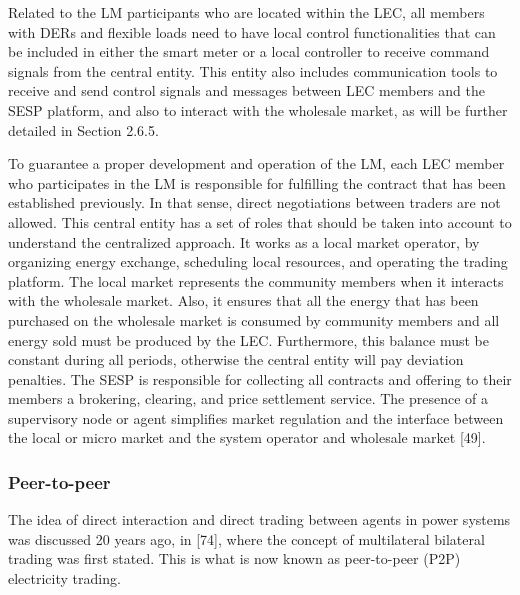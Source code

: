 Related to the LM participants who are located within the LEC, all members with DERs and flexible loads need to have local control functionalities that can be included in either the smart meter or a local controller to receive command signals from the central entity. This entity also includes communication tools to receive and send control signals and messages between LEC members and the SESP platform, and also to interact with the wholesale market, as will be further detailed in Section 2.6.5.

To guarantee a proper development and operation of the LM, each LEC member who participates in the LM is responsible for fulfilling the contract that has been established previously. In that sense, direct negotiations between traders are not allowed. This central entity has a set of roles that should be taken into account to understand the centralized approach. It works as a local market operator, by organizing energy exchange, scheduling local resources, and operating the trading platform. The local market represents the community members when it interacts with the wholesale market. Also, it ensures that all the energy that has been purchased on the wholesale market is consumed by community members and all energy sold must be produced by the LEC. Furthermore, this balance must be constant during all periods, otherwise the central entity will pay deviation penalties. The SESP is responsible for collecting all contracts and offering to their members a brokering, clearing, and price settlement service. The presence of a supervisory node or agent simplifies market regulation and the interface between the local or micro market and the system operator and wholesale market [49].

\subsubsection{Peer-to-peer}
The idea of direct interaction and direct trading between agents in power systems was discussed 20 years ago, in [74], where the concept of multilateral bilateral trading was first stated. This is what is now known as peer-to-peer (P2P) electricity trading.

